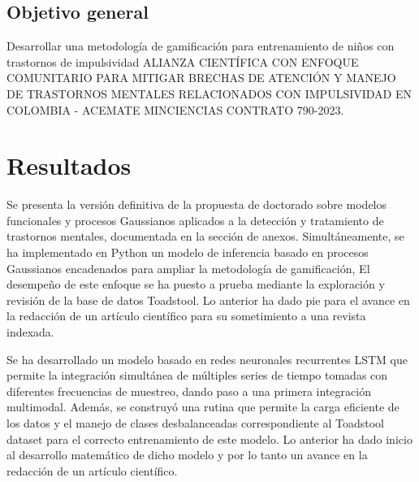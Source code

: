 \documentclass[10pt,xcdraw]{article}
\begin{document}
	\subsection{Objetivo general}
	Desarrollar una metodología de gamificación para entrenamiento de niños con trastornos de impulsividad ALIANZA CIENTÍFICA CON ENFOQUE COMUNITARIO PARA MITIGAR BRECHAS DE ATENCIÓN Y MANEJO DE TRASTORNOS MENTALES RELACIONADOS CON IMPULSIVIDAD EN COLOMBIA - ACEMATE MINCIENCIAS CONTRATO 790-2023.
	
	
	
	
	
	
	\section{Resultados}
	Se presenta la versión definitiva de la propuesta de doctorado sobre modelos funcionales y procesos Gaussianos aplicados a la detección y tratamiento de trastornos mentales, documentada en la sección de anexos. Simultáneamente, se ha implementado en Python un modelo de inferencia basado en procesos Gaussianos encadenados para ampliar la metodología de gamificación, El desempeño de este enfoque se ha puesto a prueba mediante la exploración y revisión de la base de datos Toadstool. Lo anterior ha dado pie para el avance en la redacción de un artículo científico para su sometimiento a una revista indexada. 
	
	Se ha desarrollado un modelo basado en redes neuronales recurrentes LSTM que permite la integración simultánea de múltiples series de tiempo tomadas con diferentes frecuencias de muestreo, dando paso a una primera integración multimodal. Además, se construyó una rutina que permite la carga eficiente de los datos y el manejo de clases desbalanceadas correspondiente al Toadstool dataset para el correcto entrenamiento de este modelo. Lo anterior ha dado inicio al desarrollo matemático de dicho modelo y por lo tanto un avance en la redacción de un artículo científico.
	

	
	
	
	
	
\end{document}

